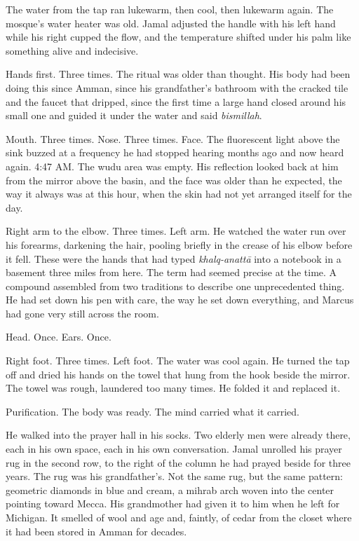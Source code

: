 

The water from the tap ran lukewarm, then cool, then lukewarm again. The mosque's water heater was old. Jamal adjusted the handle with his left hand while his right cupped the flow, and the temperature shifted under his palm like something alive and indecisive.

Hands first. Three times. The ritual was older than thought. His body had been doing this since Amman, since his grandfather's bathroom with the cracked tile and the faucet that dripped, since the first time a large hand closed around his small one and guided it under the water and said \emph{bismillah}.

Mouth. Three times. Nose. Three times. Face. The fluorescent light above the sink buzzed at a frequency he had stopped hearing months ago and now heard again. 4:47 AM. The wudu area was empty. His reflection looked back at him from the mirror above the basin, and the face was older than he expected, the way it always was at this hour, when the skin had not yet arranged itself for the day.

Right arm to the elbow. Three times. Left arm. He watched the water run over his forearms, darkening the hair, pooling briefly in the crease of his elbow before it fell. These were the hands that had typed \emph{khalq-anatt\=a} into a notebook in a basement three miles from here. The term had seemed precise at the time. A compound assembled from two traditions to describe one unprecedented thing. He had set down his pen with care, the way he set down everything, and Marcus had gone very still across the room.

Head. Once. Ears. Once.

Right foot. Three times. Left foot. The water was cool again. He turned the tap off and dried his hands on the towel that hung from the hook beside the mirror. The towel was rough, laundered too many times. He folded it and replaced it.

Purification. The body was ready. The mind carried what it carried.

He walked into the prayer hall in his socks. Two elderly men were already there, each in his own space, each in his own conversation. Jamal unrolled his prayer rug in the second row, to the right of the column he had prayed beside for three years. The rug was his grandfather's. Not the same rug, but the same pattern: geometric diamonds in blue and cream, a mihrab arch woven into the center pointing toward Mecca. His grandmother had given it to him when he left for Michigan. It smelled of wool and age and, faintly, of cedar from the closet where it had been stored in Amman for decades.

